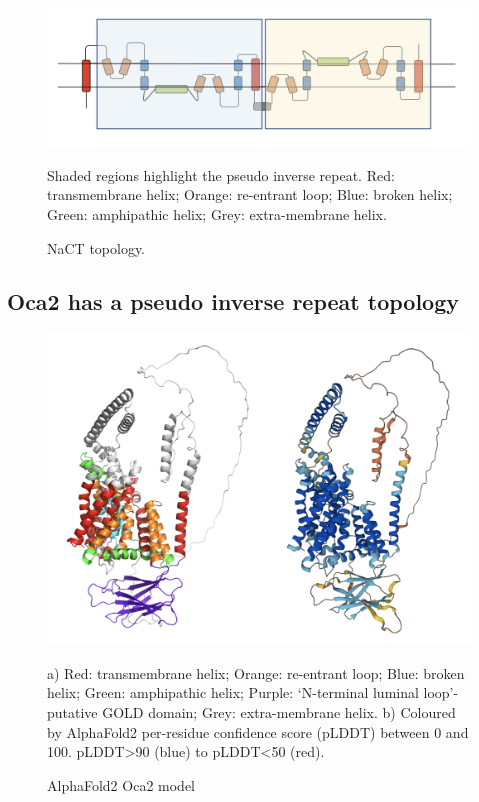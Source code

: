 \begin{figure}[th!]
    \centering
    \includegraphics[width=150mm, scale=0.75]{oca2/oca2_1.png}
    \caption{NaCT topology. }
    \label{fig:oca2_1}
    \small
    Shaded regions highlight the pseudo inverse repeat. Red: transmembrane helix; Orange: re-entrant loop; Blue: broken helix; Green: amphipathic helix; Grey: extra-membrane helix. 
\end{figure}
 

\subsection{Oca2 has a pseudo inverse repeat topology}

\begin{figure}[th!]
    \centering
    \includegraphics[width=150mm, scale=0.75]{oca2/oca2_2.png}
    \caption{AlphaFold2 Oca2 model}
    \label{fig:oca2_2}
    \small
    a) Red: transmembrane helix; Orange: re-entrant loop; Blue: broken helix; Green: amphipathic helix; Purple: ‘N-terminal luminal loop’- putative GOLD domain; Grey: extra-membrane helix. b) Coloured by AlphaFold2 per-residue confidence score (pLDDT) between 0 and 100. pLDDT>90 (blue) to pLDDT<50 (red).
\end{figure}
 

